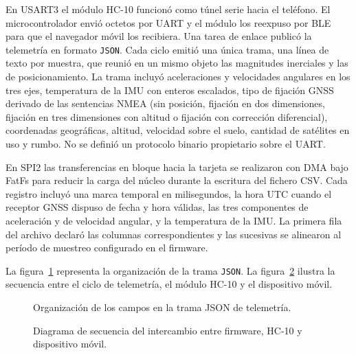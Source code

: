 En USART3 el módulo HC-10 funcionó como túnel serie hacia el teléfono. El microcontrolador envió octetos por UART y el módulo los reexpuso por BLE para que el navegador móvil los recibiera. Una tarea de enlace publicó la telemetría en formato \texttt{JSON}. Cada ciclo emitió una única trama, una línea de texto por muestra, que reunió en un mismo objeto las magnitudes inerciales y las de posicionamiento. La trama incluyó aceleraciones y velocidades angulares en los tres ejes, temperatura de la IMU con enteros escalados, tipo de fijación GNSS derivado de las sentencias NMEA \citep{nmea_0183} (sin posición, fijación en dos dimensiones, fijación en tres dimensiones con altitud o fijación con corrección diferencial), coordenadas geográficas, altitud, velocidad sobre el suelo, cantidad de satélites en uso y rumbo. No se definió un protocolo binario propietario sobre el UART.

En SPI2 las transferencias en bloque hacia la tarjeta se realizaron con DMA bajo FatFs para reducir la carga del núcleo durante la escritura del fichero CSV. Cada registro incluyó una marca temporal en milisegundos, la hora UTC cuando el receptor GNSS dispuso de fecha y hora válidas, las tres componentes de aceleración y de velocidad angular, y la temperatura de la IMU. La primera fila del archivo declaró las columnas correspondientes y las sucesivas se alinearon al período de muestreo configurado en el firmware.

La figura~\ref{fig:cap3-formato-mensaje} representa la organización de la trama \texttt{JSON}. La figura~\ref{fig:cap3-secuencia-comunicacion} ilustra la secuencia entre el ciclo de telemetría, el módulo HC-10 y el dispositivo móvil.

\begin{figure}[H]
	\centering
	\caption[Organización de la trama]{Organización de los campos en la trama JSON de telemetría.}
	\label{fig:cap3-formato-mensaje}
\end{figure}

\begin{figure}[H]
	\centering
	\caption[Secuencia de comunicación]{Diagrama de secuencia del intercambio entre firmware, HC-10 y dispositivo móvil.}
	\label{fig:cap3-secuencia-comunicacion}
\end{figure}

